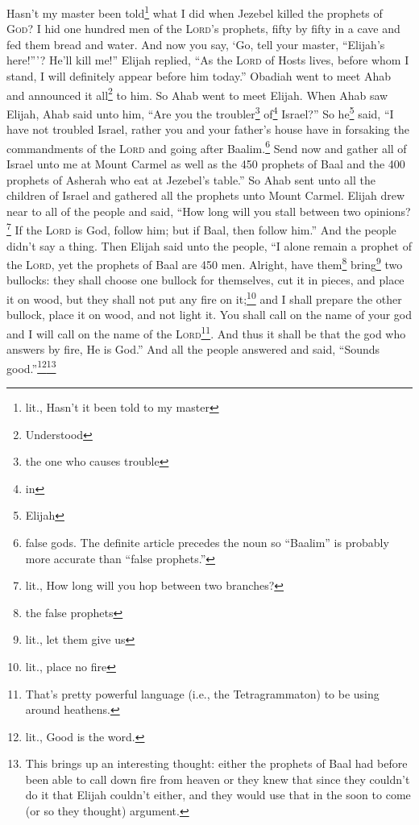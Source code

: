 \begin{inparaenum}
     Hasn't my master been told\footnote{lit., Hasn't it been told to my master} what I did when Jezebel killed the prophets of \textsc{God}? I hid one hundred men of the \textsc{Lord}'s prophets, fifty by fifty in a cave and fed them bread and water.%
     And now you say, `Go, tell your master, ``Elijah's here!''\thinspace'? He'll kill me!''%
     Elijah replied, ``As the \textsc{Lord} of Hosts lives, before whom I stand, I will definitely appear before him today.''%
     Obadiah went to meet Ahab and announced it all\footnote{Understood} to him. So Ahab went to meet Elijah.%
     When Ahab saw Elijah, Ahab said unto him, ``Are you the troubler\footnote{the one who causes trouble} of\footnote{in} Israel?''%
     So he\footnote{Elijah} said, ``I have not troubled Israel, rather you and your father's house have in forsaking the commandments of the \textsc{Lord} and going after Baalim.\footnote{false gods. The definite article precedes the noun so ``Baalim'' is probably more accurate than ``false prophets.''}%
     Send now and gather all of Israel unto me at Mount Carmel as well as the 450 prophets of Baal and the 400 prophets of Asherah who eat at Jezebel's table.''%
     So Ahab sent unto all the children of Israel and gathered all the prophets unto Mount Carmel.%
     Elijah drew near to all of the people and said, ``How long will you stall between two opinions?\footnote{lit., How long will you hop between two branches?} If the \textsc{Lord} is God, follow him; but if Baal, then follow him.'' And the people didn't say a thing.%
     Then Elijah said unto the people, ``I alone remain a prophet of the \textsc{Lord}, yet the prophets of Baal are 450 men.%
     Alright, have them\footnote{the false prophets} bring\footnote{lit., let them give us} two bullocks: they shall choose one bullock for themselves, cut it in pieces, and place it on wood, but they shall not put any fire on it;\footnote{lit., place no fire} and I shall prepare the other bullock, place it on wood, and not light it.%
     You shall call on the name of your god and I will call on the name of the \textsc{Lord}\footnote{That's pretty powerful language (i.e., the Tetragrammaton) to be using around heathens.}. And thus it shall be that the god who answers by fire, He is God.'' And all the people answered and said, ``Sounds good.''\footnote{lit., Good is the word.}\footnote{This brings up an interesting thought: either the prophets of Baal had before been able to call down fire from heaven or they knew that since they couldn't do it that Elijah couldn't either, and they would use that in the soon to come (or so they thought) argument.}%

\end{inparaenum}
